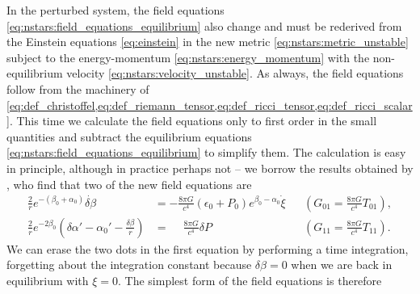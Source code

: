 In the perturbed system, the field equations \eqref{eq:nstars:field_equations_equilibrium} also change and must be rederived from the Einstein equations \eqref{eq:einstein} in the new metric \eqref{eq:nstars:metric_unstable} subject to the energy-momentum \eqref{eq:nstars:energy_momentum} with the non-equilibrium velocity \eqref{eq:nstars:velocity_unstable}.
As always, the field equations follow from the machinery of \cref{eq:def_christoffel,eq:def_riemann_tensor,eq:def_ricci_tensor,eq:def_ricci_scalar}.
This time we calculate the field equations only to first order in the small quantities and subtract the equilibrium equations \eqref{eq:nstars:field_equations_equilibrium} to simplify them.
The calculation is easy in principle, although in practice perhaps not -- we borrow the results obtained by \cite[§26.4d]{ref:mtw}, who find that two of the new field equations are
\begin{subequations}
\begin{align}
	\frac{2}{r} e^{-(\beta_0 + \alpha_0)} \dot{\delta\beta}                                     &= - \frac{8 \pi G}{c^4} (\epsilon_0 + P_0) e^{\beta_0 - \alpha_0} \dot\xi                         && \left( G_{01} = \frac{8 \pi G}{c^4} T_{01} \right) , \\
	\frac{2}{r} e^{-2\beta_0} \left( \delta\alpha' - \alpha_0' - \frac{\delta \beta}{r} \right) &= \phantom{-} \frac{8 \pi G}{c^4} \delta P                                                                    && \left( G_{11} = \frac{8 \pi G}{c^4} T_{11} \right) .
\end{align}
\end{subequations}
We can erase the two dots in the first equation by performing a time integration, forgetting about the integration constant because $\delta\beta=0$ when we are back in equilibrium with $\xi=0$.
The simplest form of the field equations is therefore
